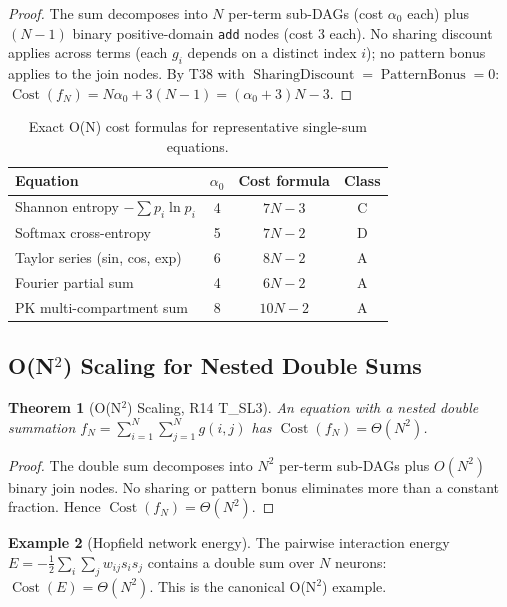 \documentclass[12pt,a4paper]{article}
\newtheorem{theorem}{Theorem}[section]
\theoremstyle{definition}
\newtheorem{example}[theorem]{Example}
\newcommand{\Cost}{\operatorname{Cost}}
\newcommand{\SD}{\operatorname{SharingDiscount}}
\newcommand{\PB}{\operatorname{PatternBonus}}
\begin{document}
\begin{proof}
The sum decomposes into $N$ per-term sub-DAGs (cost $\alpha_0$ each) plus
$(N-1)$ binary positive-domain \texttt{add} nodes (cost 3 each).  No sharing
discount applies across terms (each $g_i$ depends on a distinct index $i$);
no pattern bonus applies to the join nodes.  By T38 with $\SD=\PB=0$:
$\Cost(f_N) = N\alpha_0 + 3(N-1) = (\alpha_0+3)N - 3$.
\end{proof}

\begin{table}[h]
\centering
\caption{Exact O(N) cost formulas for representative single-sum equations.}
\label{tab:ON}
\smallskip
\begin{tabular}{@{}lccc@{}}
\toprule
\textbf{Equation} & $\alpha_0$ & \textbf{Cost formula} & \textbf{Class} \\
\midrule
Shannon entropy $-\sum p_i \ln p_i$ & 4  & $7N - 3$  & C \\
Softmax cross-entropy               & 5  & $7N - 2$  & D \\
Taylor series (sin, cos, exp)       & 6  & $8N - 2$  & A \\
Fourier partial sum                 & 4  & $6N - 2$  & A \\
PK multi-compartment sum            & 8  & $10N - 2$ & A \\
\bottomrule
\end{tabular}
\end{table}

\subsection{O(N$^2$) Scaling for Nested Double Sums}

\begin{theorem}[O(N$^2$) Scaling, R14 T\_SL3]
\label{thm:ON2}
An equation with a nested double summation
$f_N = \sum_{i=1}^{N}\sum_{j=1}^{N} g(i,j)$
has $\Cost(f_N) = \Theta(N^2)$.
\end{theorem}

\begin{proof}
The double sum decomposes into $N^2$ per-term sub-DAGs plus $O(N^2)$ binary
join nodes.  No sharing or pattern bonus eliminates more than a constant
fraction.  Hence $\Cost(f_N) = \Theta(N^2)$.
\end{proof}

\begin{example}[Hopfield network energy]
The pairwise interaction energy $E = -\frac{1}{2}\sum_i\sum_j w_{ij}s_i s_j$
contains a double sum over $N$ neurons: $\Cost(E) = \Theta(N^2)$.
This is the canonical O(N$^2$) example.
\end{example}
\end{document}
